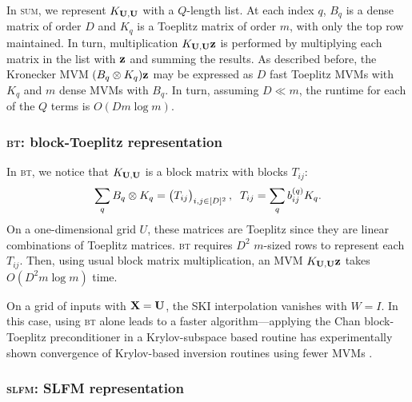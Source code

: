 \documentclass{article}
\begin{document}
In \textsc{sum}, we represent $K_{\textbf{U},\textbf{U}}$ with a $Q$-length list. At each index $q$, $B_q$ is a dense matrix of order $D$ and $K_q$ is a Toeplitz matrix of order $m$, with only the top row maintained. In turn, multiplication $K_{\textbf{U},\textbf{U}}\textbf{z}$ is performed by multiplying each matrix in the list with $\textbf{z}$ and summing the results. As described before, the Kronecker MVM $(B_q\otimes K_q)\textbf{z}$ may be expressed as $D$ fast Toeplitz MVMs with $K_q$ and $m$ dense MVMs with $B_q$. In turn, assuming $D\ll m$, the runtime for each of the $Q$ terms is $O(Dm\log m)$.

\subsubsection{\textsc{bt}: block-Toeplitz representation}

In \textsc{bt}, we notice that $K_{\textbf{U},\textbf{U}}$ is a block matrix with blocks $T_{ij}$:
\begin{align*}
\sum_qB_q\otimes K_q =\begin{pmatrix} T_{ij} \end{pmatrix}_{i,j\in[D]^2},\;\; T_{ij}=\sum_qb_{ij}^{(q)}K_q.
\end{align*}
On a one-dimensional grid $U$, these matrices are Toeplitz since they are linear combinations of Toeplitz matrices. \textsc{bt} requires $D^2$ $m$-sized rows to represent each $T_{ij}$. Then, using usual block matrix multiplication, an MVM $K_{\textbf{U},\textbf{U}}\textbf{z}$ takes $O(D^2m\log m)$ time.

On a grid of inputs with $\textbf{X}=\textbf{U}$, the SKI interpolation vanishes with $W=I$. In this case, using \textsc{bt} alone leads to a faster algorithm---applying the Chan block-Toeplitz preconditioner in a Krylov-subspace based routine has experimentally shown convergence of Krylov-based inversion routines using fewer MVMs \cite{chan1994circulant}.

\subsubsection{\textsc{slfm}: SLFM representation}
\end{document}
